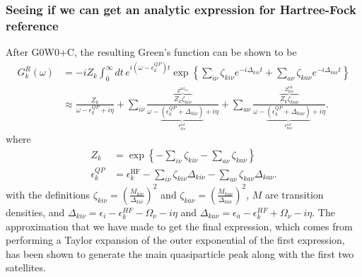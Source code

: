 \subsubsection{Seeing if we can get an analytic expression for Hartree-Fock reference}
After G0W0+C, the resulting Green's function can be shown to be 
\begin{align}
    G_k^R(\omega )&= -i Z_k \int_0^\infty dt\, e^{i(\omega - \epsilon_k^{QP}) t} \exp\left\{\sum_{i\nu} \zeta_{ki\nu} e^{-i\Delta_{ki\nu} t} + \sum_{a\nu} \zeta_{ka\nu} e^{-i\Delta_{ka\nu} t}\right\} \\
&\approx  \frac{Z_k}{\omega - \epsilon_k^{QP} + i\eta} + \sum_{i\nu} \frac{\overbrace{Z_k \zeta_{ki\nu}}^{Z^{\text{sat}_{ki\nu}}}}{\omega - \underbrace{\left(\epsilon_k^{QP} + \Delta_{ki\nu}\right)}_{\epsilon^{\text{sat}}_{ki\nu}} + i\eta} + \sum_{a\nu} \frac{\overbrace{Z_k \zeta_{ka\nu}}^{Z^{\text{sat}}_{ka\nu}}}{\omega - \underbrace{\left(\epsilon_k^{QP} + \Delta_{ka\nu}\right)}_{\epsilon^{\text{sat}}_{ka\nu}} + i\eta}.
\end{align}
where 
\begin{align}
    Z_k &= \exp\left\{-\sum_{i\nu} \zeta_{ki\nu} - \sum_{a\nu} \zeta_{ka\nu} \right\} \\
    \epsilon_k^{QP} &= {\epsilon}_k^{\text{HF}} - \sum_{i\nu} \zeta_{ki\nu} \Delta_{ki\nu} - \sum_{a\nu} \zeta_{ka\nu} \Delta_{ka\nu}.
\end{align}
with the definitions $\zeta_{ki\nu} = \left(\frac{M_{ki\nu}}{\Delta_{ki\nu}}\right)^2$ and $\zeta_{ka\nu} = \left(\frac{M_{ka\nu}}{\Delta_{ka\nu}}\right)^2$, $M$ are transition densities, and $\Delta_{ki\nu} = \epsilon_i - \epsilon_k^{HF} - \Omega_\nu - i \eta$ and $\Delta_{ka\nu} = \epsilon_a - \epsilon_k^{HF} + \Omega_\nu - i \eta$.
The approximation that we have made to get the final expression, which comes from performing a Taylor expansion of the outer exponential of the first expression, has been shown to generate the main quasiparticle peak along with the first two satellites.
